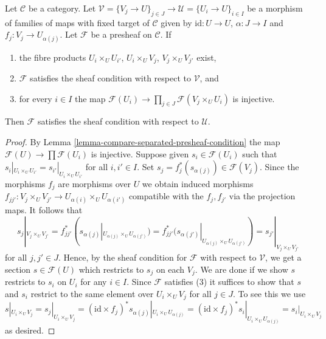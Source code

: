 \begin{lemma}
\label{lemma-compare-sheaf-condition}
Let $\mathcal{C}$ be a category. Let $\mathcal{V} = \{V_j \to U\}_{j \in J} \to
\mathcal{U} = \{U_i \to U\}_{i \in I}$ be a morphism of families of maps
with fixed target of $\mathcal{C}$ given by $\text{id} : U \to U$,
$\alpha : J \to I$ and $f_j : V_j \to U_{\alpha(j)}$. Let $\mathcal{F}$
be a presheaf on $\mathcal{C}$. If
\begin{enumerate}
\item the fibre products $U_i \times_U U_{i'}$, $U_i \times_U V_j$,
$V_j \times_U V_{j'}$ exist,
\item $\mathcal{F}$ satisfies the sheaf condition with respect to
$\mathcal{V}$, and
\item for every $i \in I$ the map
$\mathcal{F}(U_i) \to \prod_{j \in J} \mathcal{F}(V_j \times_U U_i)$
is injective.
\end{enumerate}
Then $\mathcal{F}$ satisfies the sheaf condition with respect to $\mathcal{U}$.
\end{lemma}

\begin{proof}
By Lemma \ref{lemma-compare-separated-presheaf-condition} the map
$\mathcal{F}(U) \to \prod \mathcal{F}(U_i)$ is injective.
Suppose given
$s_i \in \mathcal{F}(U_i)$ such that $s_i|_{U_i \times_U U_{i'}}
= s_{i'}|_{U_i \times_U U_{i'}}$ for all $i, i' \in I$.
Set $s_j = f_j^*(s_{\alpha(j)}) \in \mathcal{F}(V_j)$.
Since the morphisms $f_j$ are morphisms over $U$ we obtain
induced morphisms $f_{jj'} : V_j \times_U V_{j'} \to
U_{\alpha(i)} \times_U U_{\alpha(i')}$ compatible with the
$f_j, f_{j'}$ via the projection maps. It follows that
$$
s_j|_{V_j \times_U V_{j'}}
= f_{jj'}^*(s_{\alpha(j)}|_{U_{\alpha(j)} \times_U U_{\alpha(j')}})
= f_{jj'}^*(s_{\alpha(j')}|_{U_{\alpha(j)} \times_U U_{\alpha(j')}})
= s_{j'}|_{V_j \times_U V_{j'}}
$$
for all $j, j' \in J$. Hence, by the sheaf condition
for $\mathcal{F}$ with respect to $\mathcal{V}$, we get a section
$s \in \mathcal{F}(U)$ which restricts to $s_j$ on each $V_j$.
We are done if we show $s$ restricts to $s_i$ on $U_i$
for any $i \in I$. Since $\mathcal{F}$ satisfies (3) it
suffices to show that $s$ and $s_i$ restrict to the
same element over $U_i \times_U V_j$ for all $j \in J$.
To see this we use
$$
s|_{U_i \times_U V_j} = s_j|_{U_i \times_U V_j} =
(\text{id} \times f_j)^*s_{\alpha(j)}|_{U_i \times_U U_{\alpha(j)}} =
(\text{id} \times f_j)^*s_i|_{U_i \times_U U_{\alpha(j)}} =
s_i|_{U_i \times_U V_j}
$$
as desired.
\end{proof}

